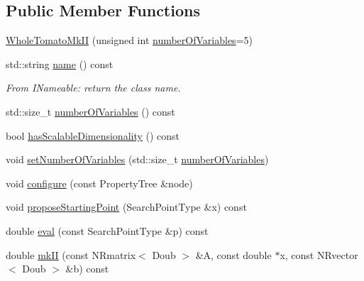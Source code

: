 \subsection*{\-Public \-Member \-Functions}
\begin{DoxyCompactItemize}
\item 
\hyperlink{struct_p_r_p_s_evolution_1_1_models_1_1_whole_tomato_mk_i_i_aece103e36ea7db2f2bb9963de249a080}{\-Whole\-Tomato\-Mk\-I\-I} (unsigned int \hyperlink{struct_p_r_p_s_evolution_1_1_models_1_1_whole_tomato_mk_i_i_afd874a7764bb9f9703e5be07525d3aa6}{number\-Of\-Variables}=5)
\item 
std\-::string \hyperlink{struct_p_r_p_s_evolution_1_1_models_1_1_whole_tomato_mk_i_i_a93eb6561ef42dad85df220ba6432d004}{name} () const 
\begin{DoxyCompactList}\small\item\em \-From \-I\-Nameable\-: return the class name. \end{DoxyCompactList}\item 
std\-::size\-\_\-t \hyperlink{struct_p_r_p_s_evolution_1_1_models_1_1_whole_tomato_mk_i_i_afd874a7764bb9f9703e5be07525d3aa6}{number\-Of\-Variables} () const 
\item 
bool \hyperlink{struct_p_r_p_s_evolution_1_1_models_1_1_whole_tomato_mk_i_i_ad8e800f83379b228e981db9eb9a8e9e3}{has\-Scalable\-Dimensionality} () const 
\item 
void \hyperlink{struct_p_r_p_s_evolution_1_1_models_1_1_whole_tomato_mk_i_i_a64698837d9c085935745af9af7b1dff7}{set\-Number\-Of\-Variables} (std\-::size\-\_\-t \hyperlink{struct_p_r_p_s_evolution_1_1_models_1_1_whole_tomato_mk_i_i_afd874a7764bb9f9703e5be07525d3aa6}{number\-Of\-Variables})
\item 
void \hyperlink{struct_p_r_p_s_evolution_1_1_models_1_1_whole_tomato_mk_i_i_a74c42b4a495c5744fc67a8b41911af5d}{configure} (const \-Property\-Tree \&node)
\item 
void \hyperlink{struct_p_r_p_s_evolution_1_1_models_1_1_whole_tomato_mk_i_i_ab3a38bd7b83a06d8c3c8a1b2b0879a8e}{propose\-Starting\-Point} (\-Search\-Point\-Type \&x) const 
\item 
double \hyperlink{struct_p_r_p_s_evolution_1_1_models_1_1_whole_tomato_mk_i_i_a51311bcf23b7a56e2de1b44cdbf8f91b}{eval} (const \-Search\-Point\-Type \&p) const 
\item 
double \hyperlink{struct_p_r_p_s_evolution_1_1_models_1_1_whole_tomato_mk_i_i_a3deb8935cb3d341eb0b8e95197867bae}{mk\-I\-I} (const \-N\-Rmatrix$<$ \-Doub $>$ \&\-A, const double $\ast$x, const \-N\-Rvector$<$ \-Doub $>$ \&b) const 

\end{DoxyCompactItemize}
